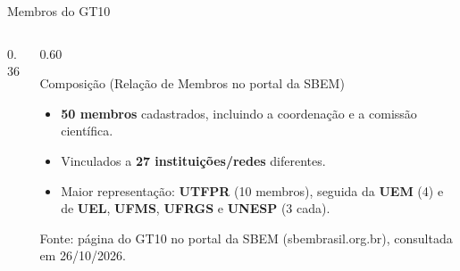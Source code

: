 \documentclass[10pt, aspectratio=169]{beamer}
\begin{document}
\begin{frame}{Membros do GT10}
    \transdissolve[duration=0.4]
    \begin{columns}[c]
        \begin{column}{0.36\textwidth}
            \centering
        \end{column}
        \begin{column}{0.60\textwidth}
            \begin{block}{Composição (Relação de Membros no portal da SBEM)}
                \begin{itemize}
                    \item \textbf{50 membros} cadastrados, incluindo a coordenação e a comissão científica.
                    \pause
                    \item Vinculados a \textbf{27 instituições/redes} diferentes.
                    \pause
                    \item Maior representação: \textbf{UTFPR} (10 membros), seguida da \textbf{UEM} (4) e de \textbf{UEL}, \textbf{UFMS}, \textbf{UFRGS} e \textbf{UNESP} (3 cada).
                \end{itemize}
            \end{block}
            {\tiny Fonte: página do GT10 no portal da SBEM (sbembrasil.org.br), consultada em 26/10/2026.}
        \end{column}
    \end{columns}
\end{frame}

\end{document}
